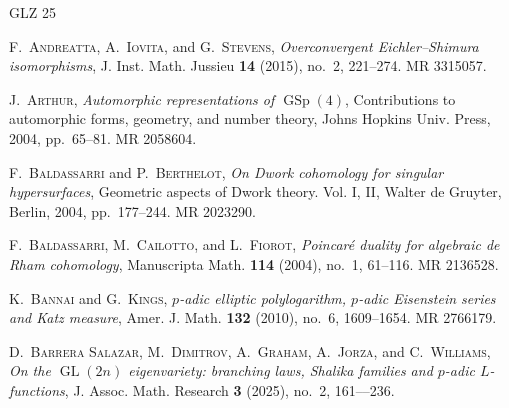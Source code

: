 \documentclass[cjm]{ipart}
\theoremstyle{plain}
\theoremstyle{remark}
\numberwithin{equation}{subsection}
\begin{document}
%
\newcommand{\noopsort}[1]{\relax}
 
\newcommand{\etalchar}[1]{$^{#1}$}
\providecommand{\bysame}{\leavevmode\hbox to3em{\hrulefill}\thinspace}
\providecommand{\MR}[1]{%
 MR \href{http://www.ams.org/mathscinet-getitem?mr=#1}{#1}.
}
\providecommand{\href}[2]{#2}
\newcommand{\articlehref}[2]{\href{#1}{#2}}
\begin{thebibliography}{GLZ 25}

\textsc{F.~Andreatta, A.~Iovita,} and \textsc{G.~Stevens},
  \articlehref{http://doi.org/10.1017/S1474748013000364}{\emph{Overconvergent
  {E}ichler--{S}himura isomorphisms}}, J. Inst. Math. Jussieu \textbf{14}
  (2015), no.~2, 221--274. \MR{3315057}

\textsc{J.~Arthur}, \emph{Automorphic representations of
  {$\operatorname{GSp}(4)$}}, Contributions to automorphic forms, geometry, and
  number theory, Johns Hopkins Univ. Press, 2004, pp.~65--81. \MR{2058604}

\textsc{F.~Baldassarri} and \textsc{P.~Berthelot}, \emph{On {D}work cohomology
  for singular hypersurfaces}, Geometric aspects of {D}work theory. {V}ol. {I},
  {II}, Walter de Gruyter, Berlin, 2004, pp.~177--244. \MR{2023290}

\textsc{F.~Baldassarri, M.~Cailotto,} and \textsc{L.~Fiorot},
  \articlehref{http://doi.org/10.1007/s00229-004-0448-y}{\emph{Poincar\'e
  duality for algebraic de {R}ham cohomology}}, Manuscripta Math. \textbf{114}
  (2004), no.~1, 61--116. \MR{2136528}

\textsc{K.~Bannai} and \textsc{G.~Kings},
  \articlehref{http://doi.org/10.1353/ajm.2010.0012}{\emph{{$p$}-adic elliptic
  polylogarithm, {$p$}-adic {E}isenstein series and {K}atz measure}}, Amer. J.
  Math. \textbf{132} (2010), no.~6, 1609--1654. \MR{2766179}

\bibitem[BD{\etalchar{+}}25]{BDGJW25}
\textsc{D.~{Barrera Salazar}, M.~Dimitrov, A.~Graham, A.~Jorza,} and
  \textsc{C.~Williams},
  \articlehref{http://doi.org/10.56994/JAMR.003.002.002}{\emph{On the
  {$\operatorname{GL}(2n)$} eigenvariety: branching laws, {S}halika families
  and {$p$}-adic {$L$}-functions}}, J. Assoc. Math. Research \textbf{3} (2025),
  no.~2, 161--–236.


\end{thebibliography}
\end{document}
